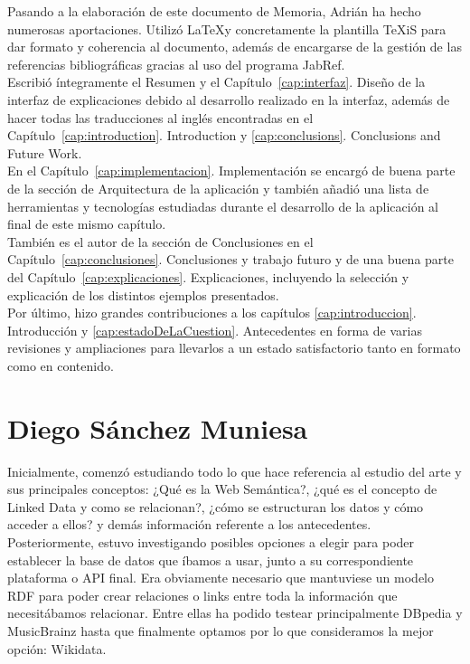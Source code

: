 Pasando a la elaboración de este documento de Memoria, Adrián ha hecho numerosas aportaciones. Utilizó \LaTeX y concretamente la plantilla TeXiS para dar formato y coherencia al documento, además de encargarse de la gestión de las referencias bibliográficas gracias al uso del programa JabRef. \\

Escribió íntegramente el Resumen y el Capítulo~\ref{cap:interfaz}. Diseño de la interfaz de explicaciones debido al desarrollo realizado en la interfaz, además de hacer todas las traducciones al inglés encontradas en el Capítulo~\ref{cap:introduction}. Introduction y \ref{cap:conclusions}. Conclusions and Future Work. \\


En el Capítulo~\ref{cap:implementacion}. Implementación se encargó de buena parte de la sección de Arquitectura de la aplicación y  también añadió una lista de herramientas y tecnologías estudiadas durante el desarrollo de la aplicación al final de este mismo capítulo. \\

También es el autor de la sección de Conclusiones en el Capítulo~\ref{cap:conclusiones}. Conclusiones y trabajo futuro y de una buena parte del Capítulo~\ref{cap:explicaciones}. Explicaciones, incluyendo la selección y explicación de los distintos ejemplos presentados. \\

Por último, hizo grandes contribuciones a los capítulos \ref{cap:introduccion}. Introducción y \ref{cap:estadoDeLaCuestion}. Antecedentes en forma de varias revisiones y ampliaciones para llevarlos a un estado satisfactorio tanto en formato como en contenido. \\


\section{Diego Sánchez Muniesa}

Inicialmente, comenzó estudiando todo lo que hace referencia al estudio del arte y sus principales conceptos: ¿Qué es la Web Semántica?, ¿qué es el concepto de Linked Data y como se relacionan?, ¿cómo se estructuran los datos y cómo acceder a ellos? y demás información referente a los antecedentes.\\

Posteriormente, estuvo investigando posibles opciones a elegir para poder establecer la base de datos que íbamos a usar, junto a su correspondiente plataforma o API final. Era obviamente necesario que mantuviese un modelo RDF para poder crear relaciones o links entre toda la información que necesitábamos relacionar. Entre ellas ha podido testear principalmente DBpedia y MusicBrainz hasta que finalmente optamos por lo que consideramos la mejor opción: Wikidata.\\

